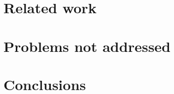 \documentclass[11pt,a4paper]{article}
\begin{document}
\section{Related work}
\label{sec:related-work}

\section{Problems not addressed}
\label{sec:probl-not-addr}





\section{Conclusions}
\label{sec:conclusions}



\end{document}
